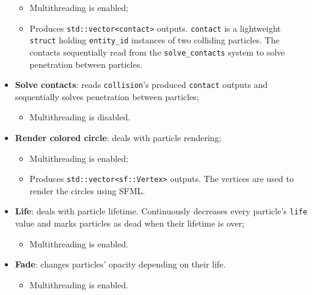 \documentclass[twoside, 12pt, a4paper, openright]{book}
\providecommand{\tightlist}{%
  \setlength{\itemsep}{0pt}\setlength{\parskip}{0pt}}
\begin{document}
\begin{itemize}
  \begin{itemize}
  \item
    Multithreading is enabled;
  \item
    Produces
    \texttt{std::vector<contact>}
    outputs.
    \texttt{contact}
    is a lightweight
    \texttt{struct}
    holding
    \texttt{entity_id}
    instances of two colliding particles. The contacts sequentially read
    from the
    \texttt{solve_contacts}
    system to solve penetration between particles.
  \end{itemize}
\item
  \textbf{Solve contacts}: reads
  \texttt{collision}'s
  produced
  \texttt{contact}
  outputs and sequentially solves penetration between particles;

  \begin{itemize}
  \tightlist
  \item
    Multithreading is disabled.
  \end{itemize}
\item
  \textbf{Render colored circle}: deals with particle rendering;

  \begin{itemize}
  \item
    Multithreading is enabled;
  \item
    Produces
    \texttt{std::vector<sf::Vertex>}
    outputs. The vertices are used to render the circles using SFML.
  \end{itemize}
\item
  \textbf{Life}: deals with particle lifetime. Continuously decreases
  every particle's
  \texttt{life}
  value and marks particles as dead when their lifetime is over;

  \begin{itemize}
  \tightlist
  \item
    Multithreading is enabled.
  \end{itemize}
\item
  \textbf{Fade}: changes particles' opacity depending on their life.

  \begin{itemize}
  \tightlist
  \item
    Multithreading is enabled.
  \end{itemize}
\end{itemize}
\end{document}
